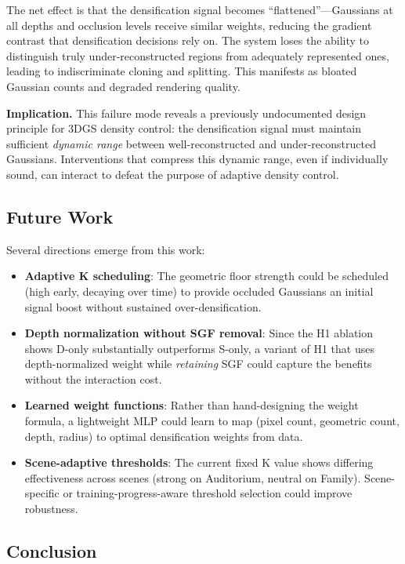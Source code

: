 \documentclass[conference]{IEEEtran}
\begin{document}
The net effect is that the densification signal becomes ``flattened''—Gaussians at all depths and occlusion levels receive similar weights, reducing the gradient contrast that densification decisions rely on. The system loses the ability to distinguish truly under-reconstructed regions from adequately represented ones, leading to indiscriminate cloning and splitting. This manifests as bloated Gaussian counts and degraded rendering quality.

\textbf{Implication.} This failure mode reveals a previously undocumented design principle for 3DGS density control: the densification signal must maintain sufficient \emph{dynamic range} between well-reconstructed and under-reconstructed Gaussians. Interventions that compress this dynamic range, even if individually sound, can interact to defeat the purpose of adaptive density control.

\subsection{Future Work}

Several directions emerge from this work:

\begin{itemize}
    \item \textbf{Adaptive K scheduling}: The geometric floor strength could be scheduled (high early, decaying over time) to provide occluded Gaussians an initial signal boost without sustained over-densification.
    \item \textbf{Depth normalization without SGF removal}: Since the H1 ablation shows D-only substantially outperforms S-only, a variant of H1 that uses depth-normalized weight while \emph{retaining} SGF could capture the benefits without the interaction cost.
    \item \textbf{Learned weight functions}: Rather than hand-designing the weight formula, a lightweight MLP could learn to map (pixel count, geometric count, depth, radius) to optimal densification weights from data.
    \item \textbf{Scene-adaptive thresholds}: The current fixed K value shows differing effectiveness across scenes (strong on Auditorium, neutral on Family). Scene-specific or training-progress-aware threshold selection could improve robustness.
\end{itemize}

\subsection{Conclusion}
\end{document}
